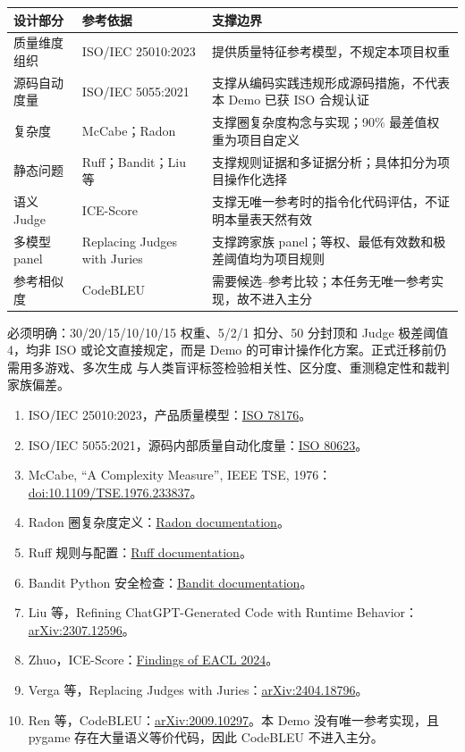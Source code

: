 \documentclass[UTF8,zihao=-4,fontset=fandol]{ctexart}
\begin{document}
\begin{center}
\begin{tabularx}{\textwidth}{p{2.8cm}X X}
\toprule
设计部分 & 参考依据 & 支撑边界\\
\midrule
质量维度组织 & ISO/IEC 25010:2023 & 提供质量特征参考模型，不规定本项目权重\\
源码自动度量 & ISO/IEC 5055:2021 & 支撑从编码实践违规形成源码措施，不代表本 Demo 已获 ISO 合规认证\\
复杂度 & McCabe；Radon & 支撑圈复杂度构念与实现；90\% 最差值权重为项目自定义\\
静态问题 & Ruff；Bandit；Liu 等 & 支撑规则证据和多证据分析；具体扣分为项目操作化选择\\
语义 Judge & ICE-Score & 支撑无唯一参考时的指令化代码评估，不证明本量表天然有效\\
多模型 panel & Replacing Judges with Juries & 支撑跨家族 panel；等权、最低有效数和极差阈值均为项目规则\\
参考相似度 & CodeBLEU & 需要候选--参考比较；本任务无唯一参考实现，故不进入主分\\
\bottomrule
\end{tabularx}
\end{center}

必须明确：30/20/15/10/10/15 权重、5/2/1 扣分、50 分封顶和 Judge 极差阈值 4，均非
ISO 或论文直接规定，而是 Demo 的可审计操作化方案。正式迁移前仍需用多游戏、多次生成
与人类盲评标签检验相关性、区分度、重测稳定性和裁判家族偏差。

\begin{enumerate}
  \item ISO/IEC 25010:2023，产品质量模型：\href{https://www.iso.org/standard/78176.html}{ISO 78176}。
  \item ISO/IEC 5055:2021，源码内部质量自动化度量：\href{https://www.iso.org/standard/80623.html}{ISO 80623}。
  \item McCabe, ``A Complexity Measure'', IEEE TSE, 1976：\href{https://doi.org/10.1109/TSE.1976.233837}{doi:10.1109/TSE.1976.233837}。
  \item Radon 圈复杂度定义：\href{https://radon.readthedocs.io/en/latest/intro.html}{Radon documentation}。
  \item Ruff 规则与配置：\href{https://docs.astral.sh/ruff/}{Ruff documentation}。
  \item Bandit Python 安全检查：\href{https://bandit.readthedocs.io/en/latest/}{Bandit documentation}。
  \item Liu 等，Refining ChatGPT-Generated Code with Runtime Behavior：\href{https://arxiv.org/abs/2307.12596}{arXiv:2307.12596}。
  \item Zhuo，ICE-Score：\href{https://aclanthology.org/2024.findings-eacl.148/}{Findings of EACL 2024}。
  \item Verga 等，Replacing Judges with Juries：\href{https://arxiv.org/abs/2404.18796}{arXiv:2404.18796}。
  \item Ren 等，CodeBLEU：\href{https://arxiv.org/abs/2009.10297}{arXiv:2009.10297}。本 Demo 没有唯一参考实现，且 pygame 存在大量语义等价代码，因此 CodeBLEU 不进入主分。
\end{enumerate}
\end{document}
